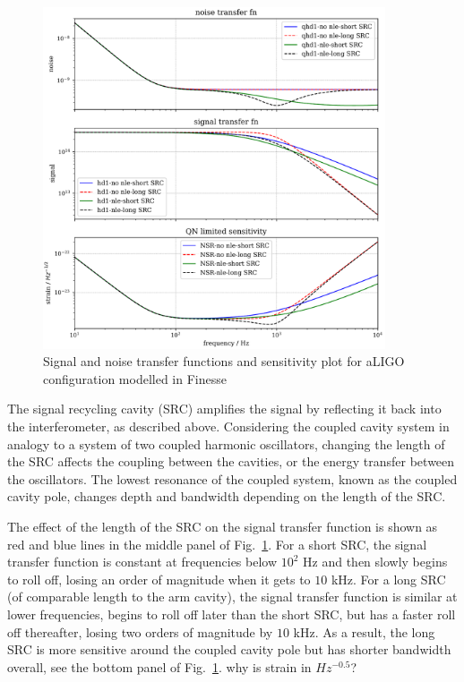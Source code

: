 \documentclass[aps,pra,superscriptaddress,reprint,nofootinbib]{revtex4-1}
\begin{document}
\begin{figure}
	\begin{center}
	\includegraphics[width=0.9\textwidth]{figures/aLIGO_transfer_fns_and_sensitivity_comparison.pdf}
	\end{center}
	\caption{Signal and noise transfer functions and sensitivity plot for aLIGO configuration modelled in Finesse}
	\label{fig:src_transfer_functions}
\end{figure}

The signal recycling cavity (SRC) amplifies the signal by reflecting it back into the interferometer, as described above.
Considering the coupled cavity system in analogy to a system of two coupled harmonic oscillators, changing the length of the SRC affects the coupling between the cavities, or the energy transfer between the oscillators. The lowest resonance of the coupled system, known as the coupled cavity pole, changes depth and bandwidth depending on the length of the SRC.


The effect of the length of the SRC on the signal transfer function is shown as red and blue lines in the middle panel of Fig.~\ref{fig:src_transfer_functions}.
For a short SRC, the signal transfer function is constant at frequencies below $10^2$ Hz and then slowly begins to roll off, losing an order of magnitude when it gets to $10$ kHz. For a long SRC (of comparable length to the arm cavity), the signal transfer function is similar at lower frequencies, begins to roll off later than the short SRC, but has a faster roll off thereafter, losing two orders of magnitude by $10$ kHz. As a result, the long SRC is more sensitive around the coupled cavity pole but has shorter bandwidth overall, see the bottom panel of Fig.~\ref{fig:src_transfer_functions}.
{\Large why is strain in $Hz^{-0.5}$?}
\end{document}

